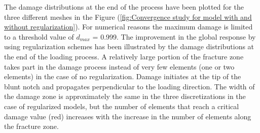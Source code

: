 \documentclass[12pt,a4paper,twoside,openright]{report}
\begin{document}
\indent\indent\indent The damage distributions at the end of the process have been plotted for the three different meshes in the Figure (\ref{fig:Convergence study for model with and without regularization}). For numerical reasons the maximum damage is limited to a threshold value of $d_{max}$ = 0.999. The improvement in the global response by using regularization schemes has been illustrated by the damage distributions at the end of the loading process. A relatively large portion of the fracture zone takes part in the damage process instead of very few elements (one or two elements) in the case of no regularization. Damage initiates at the tip of the blunt notch and propagates perpendicular to the loading direction. The width of the damage zone is approximately the same in the three discretizations in the case of regularized models, but the number of elements that reach a critical damage value (red) increases with the increase in the number of elements along the fracture zone.
\end{document}
